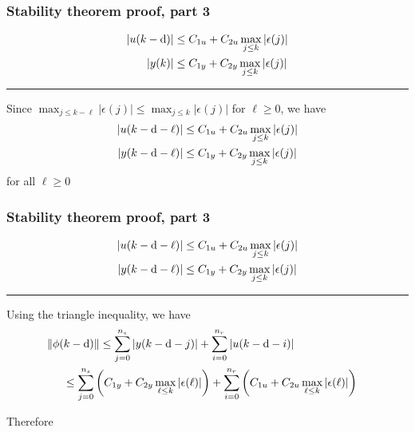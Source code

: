 \begin{frame}
    \frametitle{Stability theorem proof, part 3}

    \begin{align*}
        |u(k-\textrm{d})| & \leq C_{1u} + C_{2u} \max_{j \leq k} |\epsilon(j)| \\
        |y(k)| & \leq C_{1y} + C_{2y} \max_{j \leq k} |\epsilon(j)|
    \end{align*}
    \hrule{\hfill}
    
    Since $\displaystyle \max_{j \leq k-\ell} |\epsilon(j)| \leq \max_{j \leq k} |\epsilon(j)|$ for $\ell \geq 0$, we have
    \begin{align*}
        |u(k-\textrm{d}-\ell)| & \leq C_{1u} + C_{2u} \max_{j \leq k} |\epsilon(j)| \\
        |y(k-\textrm{d}-\ell)| & \leq C_{1y} + C_{2y} \max_{j \leq k} |\epsilon(j)|
    \end{align*}
    for all $\ell \geq 0$

\end{frame}

\begin{frame}
    \frametitle{Stability theorem proof, part 3}

    \vspace*{-\baselineskip}
    \begin{align*}
        |u(k-\textrm{d}-\ell)| & \leq C_{1u} + C_{2u} \max_{j \leq k} |\epsilon(j)| \\
        |y(k-\textrm{d}-\ell)| & \leq C_{1y} + C_{2y} \max_{j \leq k} |\epsilon(j)|
    \end{align*}
    \hrule{\hfill}

    Using the triangle inequality, we have
    \begin{align*}
        & \| \phi(k-\drm) \| \leq \sum_{j=0}^{n_s} \left| y(k-\drm-j) \right|
            + \sum_{i=0}^{n_r} \left| u(k-\drm-i) \right| \\
        & \hspace{.5cm} \begin{aligned}
        & \leq \sum_{j=0}^{n_s} \left( C_{1y} + C_{2y} \max_{\ell \leq k} |\epsilon(\ell)| \right)
            + \sum_{i=0}^{n_r} \left( C_{1u} + C_{2u} \max_{\ell \leq k} |\epsilon(\ell)| \right)%
        \end{aligned}
    \end{align*}
    \paused
    
    Therefore

\end{frame}




